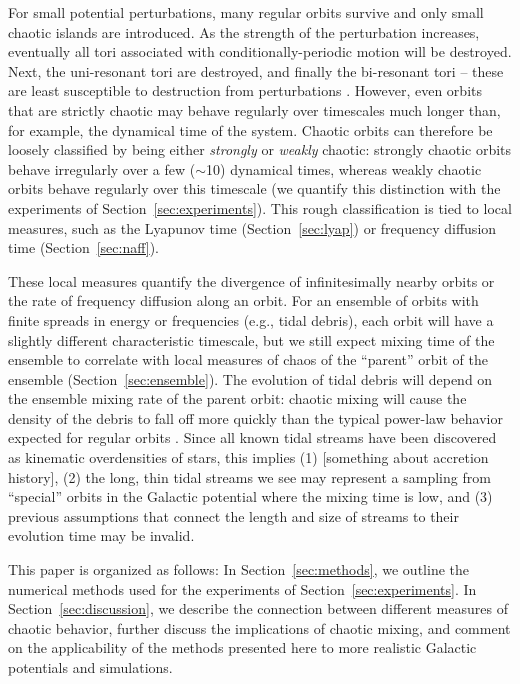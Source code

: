 \documentclass[letterpaper,12pt,preprint]{aastex}
\begin{document}
For small potential perturbations, many regular orbits survive and only small chaotic islands are introduced. As the strength of the perturbation increases, eventually all tori associated with conditionally-periodic motion will be destroyed. Next, the uni-resonant tori are destroyed, and finally the bi-resonant tori -- these are least susceptible to destruction from perturbations \citep[e.g., see][]{valluri98}. However, even orbits that are strictly chaotic may behave regularly over timescales much longer than, for example, the dynamical time of the system. Chaotic orbits can therefore be loosely classified by being either \emph{strongly} or \emph{weakly} chaotic: strongly chaotic orbits behave irregularly over a few ($\sim$10) dynamical times, whereas weakly chaotic orbits behave regularly over this timescale (we quantify this distinction with the experiments of Section~\ref{sec:experiments}). This rough classification is tied to local measures, such as the Lyapunov time (Section~\ref{sec:lyap}) or frequency diffusion time (Section~\ref{sec:naff}). 

These local measures quantify the divergence of infinitesimally nearby orbits or the rate of frequency diffusion along an orbit. For an ensemble of orbits with finite spreads in energy or frequencies (e.g., tidal debris), each orbit will have a slightly different characteristic timescale, but we still expect mixing time of the ensemble to correlate with local measures of chaos of the ``parent'' orbit of the ensemble (Section~\ref{sec:ensemble}). The evolution of tidal debris will depend on the ensemble mixing rate of the parent orbit: chaotic mixing will cause the density of the debris to fall off more quickly than the typical power-law behavior expected for regular orbits \citep[e.g.,][]{merritt96, helmi99}. Since all known tidal streams have been discovered as kinematic overdensities of stars, this implies (1) [something about accretion history], (2) the long, thin tidal streams we see may represent a sampling from ``special'' orbits in the Galactic potential where the mixing time is low, and (3) previous assumptions that connect the length and size of streams to their evolution time may be invalid.

This paper is organized as follows: In Section~\ref{sec:methods}, we outline the numerical methods used for the experiments of Section~\ref{sec:experiments}. In Section~\ref{sec:discussion}, we describe the connection between different measures of chaotic behavior, further discuss the implications of chaotic mixing, and comment on the applicability of the methods presented here to more realistic Galactic potentials and simulations.
\end{document}
